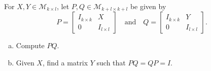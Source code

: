 \begin{exercise}
  \label{ex:hw02:block-shear-inverses}
  For \(X,Y\in\mathcal M_{k\times l}\), let
  \(P,Q\in\mathcal M_{k+l\times k+l}\) be given by
  \[
    P=\begin{bmatrix}I_{k\times k}&X\\0&I_{l\times l}\end{bmatrix}
    \quad\text{and}\quad
    Q=\begin{bmatrix}I_{k\times k}&Y\\0&I_{l\times l}\end{bmatrix}.
  \]
  \begin{enumerate}[(a)][2]
    \item Compute \(PQ\).
    \item Given \(X\), find a matrix \(Y\) such that \(PQ=QP=I\).
  \end{enumerate}
\end{exercise}

